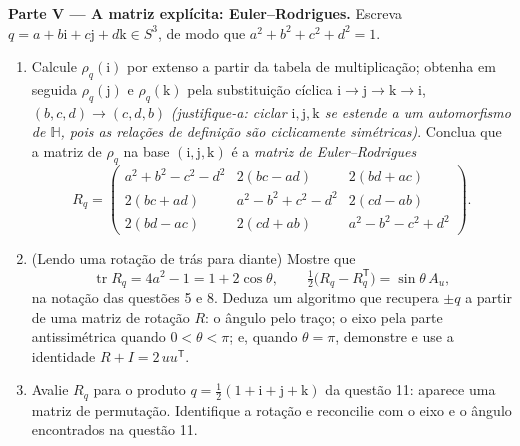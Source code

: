 \begin{problem}
\medskip
\noindent\textbf{Parte V --- A matriz explícita: Euler--Rodrigues.}
Escreva $q = a + b\mathrm i + c\mathrm j +
d\mathrm k \in S^3$, de modo que $a^2 + b^2 + c^2 + d^2 = 1$.
\begin{enumerate}[resume]
  \item Calcule $\rho_q(\mathrm i)$ por extenso a partir da tabela de multiplicação;
        obtenha em seguida $\rho_q(\mathrm
        j)$ e $\rho_q(\mathrm k)$ pela substituição cíclica $\mathrm i \to \mathrm j \to \mathrm k
        \to \mathrm i$,
        $(b, c, d) \to (c, d, b)$ \emph{(justifique-a: ciclar $\mathrm i, \mathrm j,
        \mathrm k$ se estende a um
        automorfismo de $\mathbb
        H$, pois as relações de definição são
        ciclicamente simétricas)}. Conclua que a matriz de $\rho_q$
        na base $(\mathrm i, \mathrm j, \mathrm k)$ é a \emph{matriz de Euler--Rodrigues}
        \[
        R_q = \begin{pmatrix}
        a^2 + b^2 - c^2 - d^2 & 2(bc - ad) & 2(bd + ac)\\
        2(bc + ad) & a^2 - b^2 + c^2 - d^2 & 2(cd - ab)\\
        2(bd - ac) & 2(cd + ab) & a^2 - b^2 - c^2 + d^2
        \end{pmatrix}.
        \]
  \item (Lendo uma rotação de trás para diante) Mostre que
        \[
        \operatorname{tr}R_q = 4a^2 - 1 = 1 + 2\cos\theta,
        \qquad
        \tfrac12\bigl(R_q - R_q^{\mathsf T}\bigr) =
        \sin\theta\,A_u,
        \]
        na notação das questões 5 e 8. Deduza um algoritmo que recupera
        $\pm q$ a partir de uma matriz de rotação $R$: o ângulo
        pelo traço; o eixo pela parte antissimétrica quando $0 < \theta < \pi$; e,
        quando $\theta = \pi$, demonstre e use a identidade $R
        + I = 2\,uu^{\mathsf T}$.
  \item Avalie $R_q$ para o produto $q =
        \frac12(1 + \mathrm i + \mathrm j + \mathrm k)$ da questão 11: aparece uma
        matriz de permutação. Identifique a rotação e reconcilie com o
        eixo e o ângulo encontrados na questão 11.
\end{enumerate}


\end{problem}
